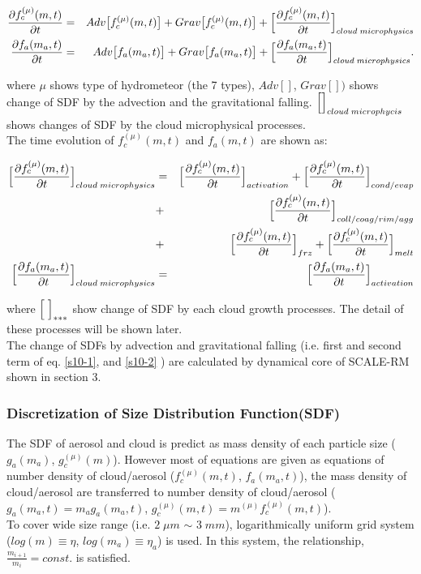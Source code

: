 \begin{eqnarray}
\frac{\partial f^{(\mu)}_{c}(m,t)}{\partial t}&=&Adv\bigl[f^{(\mu)}_{c}(m,t)\bigr]+Grav\bigl[f^{(\mu)}_{c}(m,t)\bigr]+\Bigl[ \frac{\partial f^{(\mu)}_{c}(m,t)}{\partial t}\Bigr ]_{cloud\;microphysics}\label{s10-1}\\
\frac{\partial f_{a}(m_{a},t)}{\partial t}&=&Adv\bigl[f_{a}(m_{a},t)\bigr]+Grav\bigl[f_{a}(m_{a},t)\bigr]+\Bigl[ \frac{\partial f_{a}(m_{a},t)}{\partial t} \Bigr ]_{cloud\;microphysics}.\label{s10-2}
\end{eqnarray}

where $\mu$ shows type of hydrometeor (the 7 types), $Adv[]$, $Grav[])$ shows change of SDF by the advection and the gravitational falling. $\Bigl[ \Bigr]_{cloud\;microphycis}$ shows changes of SDF by the cloud microphysical processes.\\
The time evolution of $f_{c}^{(\mu)}(m,t)$ and $f_{a}(m,t)$ are shown as:

\begin{eqnarray}
\Bigl[ \frac{\partial f_{c}^{(\mu)}(m,t)}{\partial t}\Bigl]_{cloud\;microphysics}&=&\Bigl[\frac{\partial f_{c}^{(\mu)}(m,t)}{\partial t}\Bigr]_{activation}+\Bigl[\frac{\partial f_{c}^{(\mu)}(m,t)}{\partial t}\Bigr]_{cond/evap}\nonumber\\
&+&\Bigl[\frac{\partial f_{c}^{(\mu)}(m,t)}{\partial t}\Bigr]_{coll/coag/rim/agg}\nonumber\\
&+&\Bigl[\frac{\partial f_{c}^{(\mu)}(m,t)}{\partial t}\Bigr]_{frz}+\Bigl[\frac{\partial f_{c}^{(\mu)}(m,t)}{\partial t}\Bigr]_{melt}\nonumber\\
\Bigl[ \frac{\partial f_{a}(m_{a},t)}{\partial t}\Bigl]_{cloud\;microphysics}&=&\Bigl[\frac{\partial f_{a}(m_{a},t)}{\partial t}\Bigr]_{activation}\nonumber
\end{eqnarray}

where $\Bigl[\;\Bigr]_{***}$ show change of SDF by each cloud growth processes. The detail of these processes will be shown later.\\
 The change of SDFs by advection and gravitational falling (i.e. first and second term of eq. \ref{s10-1}, and \ref{s10-2}  ) are calculated by dynamical core of SCALE-RM shown in section 3.


\subsubsection{Discretization of Size Distribution Function(SDF)}
The SDF of aerosol and cloud is predict as mass density of each particle size ($g_{a}(m_{a})$, $g_{c}^{(\mu)}(m)$). However most of equations are given as equations of number density of cloud/aerosol ($f_{c}^{(\mu)}(m,t)$, $f_{a}(m_{a},t)$), the mass density of cloud/aerosol are transferred to number density of cloud/aerosol ($g_{a}(m_{a},t)=m_{a}g_{a}(m_{a},t)$, $g_{c}^{(\mu)}(m,t)=m^{(\mu)}f_{c}^{(\mu)}(m,t)$).\\
To cover wide size range (i.e. $2\;\mu m$ $\sim$ $3\;mm$), logarithmically uniform grid system ($log(m)\equiv \eta$, $log(m_{a})\equiv \eta_{a}$) is used. In this system, the relationship, $\frac{m_{i+1}}{m_{i}}=const.$ is satisfied.

